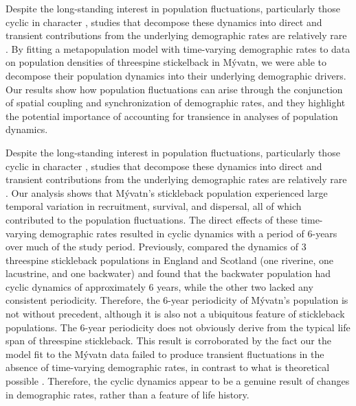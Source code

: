 \documentclass[11pt]{article}
\begin{document}
Despite the long-standing interest in population fluctuations,
particularly those cyclic in character 
\citep{elton1924, nicholson1935},
studies that decompose these dynamics into direct and transient contributions 
from the underlying demographic rates are relatively rare 
\citep{fox2000population, koons2017understanding, hoy2020fluctuations}.
By fitting a metapopulation model with time-varying demographic rates to 
data on population densities of threespine stickelback in M\'{y}vatn,
we were able to decompose their population dynamics into their 
underlying demographic drivers.
Our results show how population fluctuations can arise through the conjunction of 
spatial coupling and synchronization of demographic rates, 
and they highlight the potential importance 
of accounting for transience in analyses of population dynamics.










Despite the long-standing interest in population fluctuations,
particularly those cyclic in character 
\citep{elton1924, nicholson1935},
studies that decompose these dynamics into direct and transient contributions 
from the underlying demographic rates are relatively rare 
\citep{fox2000population, koons2017understanding, hoy2020fluctuations}.
Our analysis shows that M\'{y}vatn's stickleback population experienced
large temporal variation in recruitment, survival, and dispersal, 
all of which contributed to the population fluctuations. 
The direct effects of these time-varying demographic rates resulted in 
cyclic dynamics with a period of 6-years over much of the study period.
Previously,
\cite{wootton2005} compared the dynamics of 3 threespine stickleback populations 
in England and Scotland (one riverine, one lacustrine, and one backwater)
and found that the backwater population had cyclic dynamics of approximately
6 years, while the other two lacked any consistent periodicity.
Therefore, the 6-year periodicity of M\'{y}vatn's population is not without precedent,
although it is also not a ubiquitous feature of stickleback populations.
The 6-year periodicity does not obviously derive from the typical life span 
of threespine stickleback.
This result is corroborated by the fact our the model fit to the M\'{y}vatn data
failed to produce transient fluctuations in the absence of time-varying demographic rates,
in contrast to what is theoretical possible \citep{caswell2001, tenhumberg2009}.
Therefore, the cyclic dynamics appear to be a genuine result of changes in demographic rates,
rather than a feature of life history.
\end{document}
